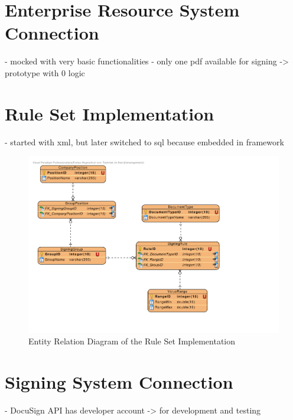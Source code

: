 \section{Enterprise Resource System Connection}
- mocked with very basic functionalities
- only one pdf available for signing -> prototype with 0 logic

\section{Rule Set Implementation}
- started with xml, but later switched to sql because embedded in framework

\begin{figure}[h!]
	\includegraphics[width=0.6\linewidth]{./implementation/images/db.pdf}
	\centering
	\caption{Entity Relation Diagram of the Rule Set Implementation}
	\label{fig:db}
\end{figure}

\section{Signing System Connection}
- DocuSign API has developer account -> for development and testing 